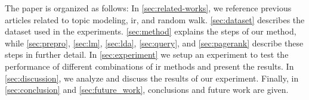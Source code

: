 The paper is organized as follows:
In \autoref{sec:related-works}, we reference previous articles related to topic modeling, \gls{ir}, and random walk.
\autoref{sec:dataset} describes the dataset used in the experiments.
\autoref{sec:method} explains the steps of our method, while \autoref{sec:prepro}, \autoref{sec:lm}, \autoref{sec:lda}, \autoref{sec:query}, and \autoref{sec:pagerank} describe these steps in further detail.
In \autoref{sec:experiment} we setup an experiment to test the performance of different combinations of \gls{ir} methods and present the results.
In \autoref{sec:discussion}, we analyze and discuss the results of our experiment.
Finally, in \autoref{sec:conclusion} and \autoref{sec:future_work}, conclusions and future work are given.
